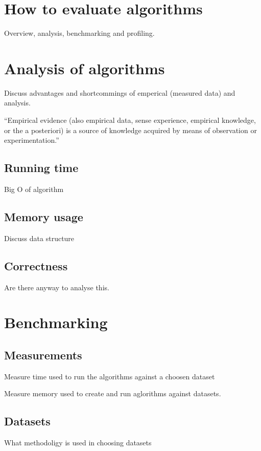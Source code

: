 \documentclass[11pt,twoside,a4paper]{report}
\begin{document}
\section{How to evaluate algorithms}
Overview, analysis, benchmarking and profiling.

\section{Analysis of algorithms}


Discuss advantages and shortcommings of emperical (measured data) and analysis.

“Empirical evidence (also empirical data, sense experience, empirical knowledge, or the a posteriori) is a source of knowledge acquired by means of observation or experimentation.”

\subsection{Running time}
Big O of algorithm

\subsection{Memory usage}
Discuss data structure

\subsection{Correctness}
Are there anyway to analyse this.

\section{Benchmarking}

\subsection{Measurements}
Measure time used to run the algorithms against a choosen dataset

Measure memory used to create and run aglorithms against datasets.

\subsection{Datasets}
What methodoligy is used in choosing datasets
\end{document}
